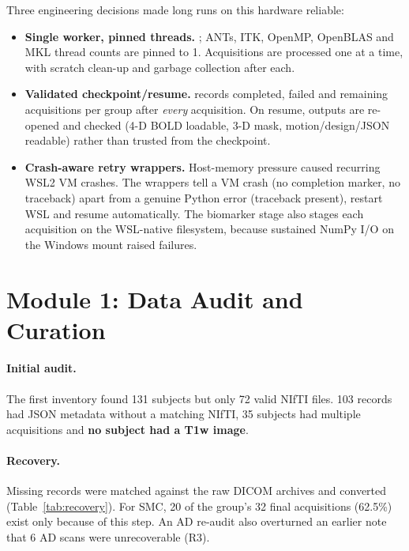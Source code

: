 \documentclass{ssnreview}
\begin{document}
Three engineering decisions made long runs on this hardware reliable:
\begin{itemize}
  \item \textbf{Single worker, pinned threads.} ; ANTs, ITK,
        OpenMP, OpenBLAS and MKL thread counts are pinned to 1. Acquisitions
        are processed one at a time, with scratch clean-up and garbage
        collection after each.
  \item \textbf{Validated checkpoint/resume.} 
        records completed, failed and remaining acquisitions per group after
        \emph{every} acquisition. On resume, outputs are re-opened and checked
        (4-D BOLD loadable, 3-D mask, motion/design/JSON readable) rather than
        trusted from the checkpoint.
  \item \textbf{Crash-aware retry wrappers.} Host-memory pressure caused
        recurring WSL2 VM crashes. The  wrappers
        tell a VM crash (no completion marker, no traceback) apart from a
        genuine Python error (traceback present), restart WSL and resume
        automatically. The biomarker stage also stages each acquisition on
        the WSL-native filesystem, because sustained NumPy I/O on the Windows
        mount raised  failures.
\end{itemize}

\section{Module 1: Data Audit and Curation}

\paragraph{Initial audit.} The first inventory found 131 subjects but only 72
valid NIfTI files. 103 records had JSON metadata without a matching NIfTI, 35
subjects had multiple acquisitions and \textbf{no subject had a T1w image}.

\paragraph{Recovery.} Missing records were matched against the raw DICOM
archives and converted (Table~\ref{tab:recovery}). For SMC, 20 of the group's
32 final acquisitions (62.5\%) exist only because of this step. An AD re-audit
also overturned an earlier note that 6 AD scans were unrecoverable (R3).
\end{document}
